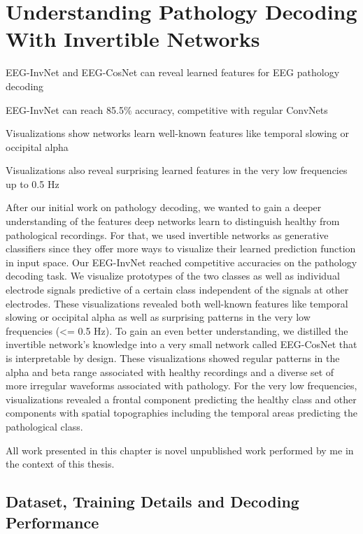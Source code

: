 \chapter{Understanding Pathology Decoding With
Invertible Networks}\label{understanding-pathology}
\vspace{2em}
\begin{startbox}{EEG-InvNet and EEG-CosNet can reveal learned features for EEG pathology decoding}
\item EEG-InvNet can reach 85.5\% accuracy, competitive with regular ConvNets
\item Visualizations show networks learn well-known features like temporal slowing or occipital alpha
\item Visualizations also reveal surprising learned features in the very low frequencies up to 0.5 Hz
\end{startbox}


    After our initial work on pathology decoding, we wanted to gain a deeper
understanding of the features deep networks learn to distinguish healthy
from pathological recordings. For that, we used invertible networks as
generative classifiers since they offer more ways to visualize their
learned prediction function in input space. Our EEG-InvNet reached
competitive accuracies on the pathology decoding task. We visualize
prototypes of the two classes as well as individual electrode signals
predictive of a certain class independent of the signals at other
electrodes. These visualizations revealed both well-known features like
temporal slowing or occipital alpha as well as surprising patterns in
the very low frequencies (\textless= 0.5 Hz). To gain an even better
understanding, we distilled the invertible network's knowledge into a
very small network called EEG-CosNet that is interpretable by design.
These visualizations showed regular patterns in the alpha and beta range
associated with healthy recordings and a diverse set of more irregular
waveforms associated with pathology. For the very low frequencies,
visualizations revealed a frontal component predicting the healthy class
and other components with spatial topographies including the temporal
areas predicting the pathological class.

All work presented in this chapter is novel unpublished work performed
by me in the context of this thesis.

\section{Dataset, Training Details and Decoding
Performance}\label{dataset-training-details-and-decoding-performance}

